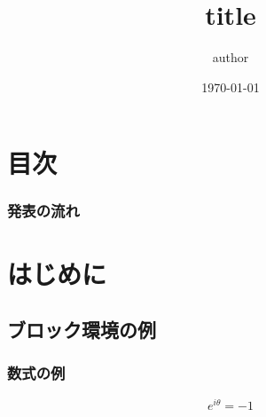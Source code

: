 \documentclass[dvipdfmx,20pt]{beamer}
\title{title}
\author{author}
\institute[TUG]{\url{al18036@shibaura-it.ac.jp}}
\date{\today}
\begin{document}
\begin{frame}
  \frametitle{}
  \titlepage
\end{frame}

\section*{目次}
\begin{frame}
  \frametitle{発表の流れ}
  \tableofcontents
\end{frame}

\section{はじめに}
\subsection{ブロック環境の例}
\begin{frame}
  \frametitle{数式の例}
  \[
    e^{i\theta} = -1
  \]
\end{frame}
\end{document}
